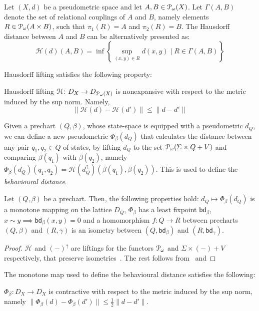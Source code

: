 \begin{remark}\label{rem:hausdorff_duality}
Let $(X, d)$ be a pseudometric space and let $A, B \in \mathcal{P}_\omega(X)$. Let $\Gamma(A,B)$ denote the set of relational couplings of $A$ and $B$, namely elements $R \in \mathcal{P}_\omega(A \times B)$, such that $\pi_1 (R)=A$ and $\pi_2(R)=B$. The Hausdorff distance between $A$ and $B$ can be alternatively presented as:
$$
	\mathcal{H}(d)(A,B) = \inf \left\{\sup_{(x,y) \in R} d(x,y) \mid R \in \Gamma(A,B) \right\}
$$
\end{remark}
Hausdorff lifting satisfies the following property:
\begin{lemma}
	Hausdorff lifting $\mathcal{H} \colon D_X \to D_{\mathcal{P}_\omega(X)}$ is nonexpansive with respect to the metric induced by the sup norm. Namely,
	$$\|\mathcal{H}(d) - \mathcal{H}(d')\| \leq \|d - d' \|$$ 
\end{lemma}
Given a prechart $(Q, \beta)$, whose state-space is equipped with a pseudometric $d_Q$, we can define a new pseudometric $\Phi_{\beta}(d_Q)$ that calculates the distance between any pair $q_1, q_2 \in Q$ of states, by lifting $d_Q$ to the set $\mathcal{P}_\omega(\Sigma \times Q + V)$ and comparing $\beta(q_1)$ with $\beta(q_2)$, namely 
	$
		\Phi_\beta(d_Q)(q_1,q_2) = \mathcal{H}\left(d_Q^\uparrow\right) (\beta(q_1), \beta(q_2))
	$. This is used to define the \emph{behavioural distance}.
	\begin{theorem}\label{thm:beh_dist}
		Let $(Q, \beta)$ be a prechart. Then, the following properties hold:  $d_Q \mapsto \Phi_\beta(d_Q)$ is a monotone mapping on the lattice $D_Q$,  $\Phi_\beta$ has a least fixpoint $\mathsf{bd}_\beta$,  $x \sim y \implies \mathsf{bd}_\beta(x,y) = 0$ and  a homomorphism $f \colon Q \to R$ between precharts $(Q, \beta)$ and $(R, \gamma)$ is an isometry between $(Q, \mathsf{bd}_\beta)$ and $(R, \mathsf{bd}_\gamma)$.
	\end{theorem}
	\begin{proof}
		$\mathcal{H}$ and $(-)^\uparrow$ are liftings for the functors $\mathcal{P}_\omega$ and $\Sigma \times (-) + V$ respectively, that preserve isometries~\cite[Theorem~5.8]{Baldan:2018:Coalgebraic}. The rest follows from~ and 
	\end{proof}
	The monotone map used to define the behavioural distance satisfies the following:
\begin{lemma}
	$\Phi_\beta \colon D_X \to D_X$ is contractive with respect to the metric induced by the sup norm, namely $
	\|\Phi_\beta(d)-\Phi_\beta(d')\| \leq \frac{1}{2}\|d-d'\|
	$.
\end{lemma}
